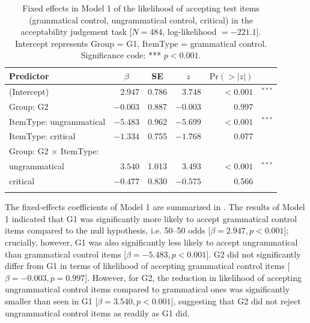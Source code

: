 \documentclass[output=paper,colorlinks,citecolor=brown]{langscibook}
\begin{document}
\begin{table}
\caption{Fixed effects in Model 1 of the likelihood of accepting test items (grammatical control, ungrammatical control, critical) in the acceptability judgement task [$N=484$, log-likelihood $=-221.1$]. Intercept represents Group = G1, ItemType = grammatical control. Significance code: *** $p<0.001$.}
\label{tab:modelAJT}
\begin{tabular}{lrrrr@{\,}l}
\lsptoprule
Predictor & \multicolumn{1}{c}{$\beta$} & \multicolumn{1}{c}{SE} & \multicolumn{1}{c}{$z$} & \multicolumn{1}{c}{$\text{Pr}(>|z|)$} & \\
\midrule
(Intercept)                                & $2.947 $ & 0.786 & $3.748 $ & $<0.001$ & $^{***}$ \\
Group: G2                                  & $-0.003$ & 0.887 & $-0.003$ & 0.997 & \\    
ItemType: ungrammatical                    & $-5.483$ & 0.962 & $-5.699$ & $<0.001$ & $^{***}$ \\
ItemType: critical                         & $-1.334$ & 0.755 & $-1.768$ & 0.077 & \\  
Group: G2 $\times$ ItemType: & \\
\quad ungrammatical & $3.540 $ & 1.013 & $3.493 $ & $<0.001$ & $^{***}$ \\
\quad critical      & $-0.477$ & 0.830 & $-0.575$ & 0.566 & \\  
\lspbottomrule
\end{tabular}
\end{table}

The fixed-effects coefficients of Model 1 are summarized in . The results of Model 1 indicated that G1 was significantly more likely to accept grammatical control items compared to the null hypothesis, i.e. 50--50 odds [$\beta=2.947,\allowbreak p<0.001$]; crucially, however, G1 was also significantly less likely to accept ungrammatical than grammatical control items [$\beta=-5.483,\allowbreak p<0.001$]. G2 did not significantly differ from G1 in terms of likelihood of accepting grammatical control items [$\beta=-0.003,\allowbreak p=0.997$]. However, for G2, the reduction in likelihood of accepting ungrammatical control items compared to grammatical ones was significantly smaller than seen in G1 [$\beta=3.540,\allowbreak p<0.001$], suggesting that G2 did not reject ungrammatical control items as readily as G1 did.
\end{document}
